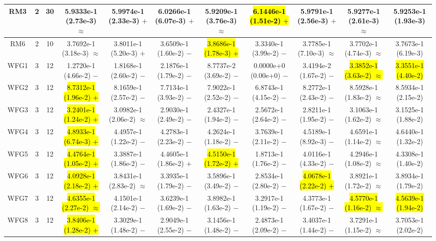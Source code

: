 \documentclass[journal]{IEEEtran}
\begin{document}
\begin{table*}[htbp]
\begin{tabular}{ccccccccccc}
\hline
\multirow{1}{*}{RM3}&2&30&5.9333e-1 (2.73e-3) $\approx$&5.9974e-1 (2.33e-3) $+$&6.0266e-1 (6.07e-3) $+$&5.9209e-1 (3.76e-3) $\approx$&\hl{6.1446e-1 (1.51e-2) $+$}&5.9791e-1 (2.56e-3) $+$&5.9277e-1 (2.61e-3) $\approx$&5.9253e-1 (1.93e-3)\\
\hline
\multirow{1}{*}{RM6}&2&10&3.7692e-1 (3.18e-3) $\approx$&3.8011e-1 (5.20e-3) $+$&3.6509e-1 (1.60e-2) $-$&\hl{3.8686e-1 (1.78e-3) $+$}&3.3340e-1 (3.99e-2) $-$&3.7785e-1 (7.10e-3) $\approx$&3.7702e-1 (4.74e-3) $\approx$&3.7673e-1 (6.19e-3)\\
\hline
\multirow{1}{*}{WFG1}&3&12&1.2720e-1 (4.66e-2) $-$&1.8168e-1 (2.60e-2) $-$&2.1876e-1 (1.79e-2) $-$&8.7737e-2 (3.69e-2) $-$&0.0000e+0 (0.00e+0) $-$&3.4194e-2 (1.67e-2) $-$&\hl{3.3852e-1 (3.63e-2) $\approx$}&\hl{3.3551e-1 (4.40e-2)}\\
\hline
\multirow{1}{*}{WFG2}&3&12&\hl{8.7312e-1 (1.96e-2) $+$}&8.1659e-1 (2.57e-2) $-$&7.7134e-1 (3.93e-2) $-$&7.9022e-1 (2.52e-2) $-$&6.8743e-1 (4.15e-2) $-$&8.2772e-1 (2.43e-2) $-$&8.5928e-1 (1.83e-2) $\approx$&8.5934e-1 (2.15e-2)\\
\hline
\multirow{1}{*}{WFG3}&3&12&\hl{3.2401e-1 (1.24e-2) $+$}&3.0982e-1 (2.06e-2) $\approx$&2.9030e-1 (2.49e-2) $-$&2.4327e-1 (1.94e-2) $-$&2.5672e-1 (2.64e-2) $-$&2.8211e-1 (1.95e-2) $-$&3.1063e-1 (1.62e-2) $\approx$&3.1525e-1 (1.88e-2)\\
\hline
\multirow{1}{*}{WFG4}&3&12&\hl{4.8933e-1 (6.74e-3) $+$}&4.4957e-1 (1.22e-2) $-$&4.2783e-1 (2.23e-2) $-$&4.2624e-1 (1.18e-2) $-$&3.7639e-1 (2.11e-2) $-$&4.5189e-1 (8.92e-3) $-$&4.6591e-1 (1.14e-2) $\approx$&4.6440e-1 (1.32e-2)\\
\hline
\multirow{1}{*}{WFG5}&3&12&\hl{4.4764e-1 (1.05e-2) $+$}&3.3887e-1 (1.86e-2) $-$&4.4605e-1 (1.86e-2) $+$&\hl{4.5150e-1 (1.72e-2) $+$}&1.8713e-1 (1.76e-2) $-$&4.0116e-1 (4.33e-2) $-$&4.2946e-1 (1.08e-2) $\approx$&4.3308e-1 (1.40e-2)\\
\hline
\multirow{1}{*}{WFG6}&3&12&\hl{4.0928e-1 (2.18e-2) $+$}&3.8431e-1 (2.83e-2) $\approx$&3.3935e-1 (1.79e-2) $-$&3.5896e-1 (3.49e-2) $-$&2.8534e-1 (2.80e-2) $-$&\hl{4.0678e-1 (2.22e-2) $+$}&3.8921e-1 (1.72e-2) $\approx$&3.8934e-1 (1.79e-2)\\
\hline
\multirow{1}{*}{WFG7}&3&12&\hl{4.6355e-1 (2.27e-2) $\approx$}&4.1501e-1 (2.14e-2) $-$&3.6239e-1 (1.69e-2) $-$&3.8982e-1 (1.63e-2) $-$&3.2917e-1 (1.19e-2) $-$&4.3773e-1 (1.67e-2) $-$&\hl{4.5770e-1 (1.16e-2) $\approx$}&\hl{4.5639e-1 (1.94e-2)}\\
\hline
\multirow{1}{*}{WFG8}&3&12&\hl{3.8406e-1 (1.28e-2) $+$}&3.3029e-1 (1.48e-2) $-$&2.9049e-1 (2.55e-2) $-$&3.1456e-1 (1.48e-2) $-$&2.4873e-1 (2.09e-2) $-$&3.4037e-1 (1.44e-2) $-$&3.7291e-1 (1.15e-2) $\approx$&3.7053e-1 (2.02e-2)\\

\end{tabular}
\end{table*}
\end{document}
